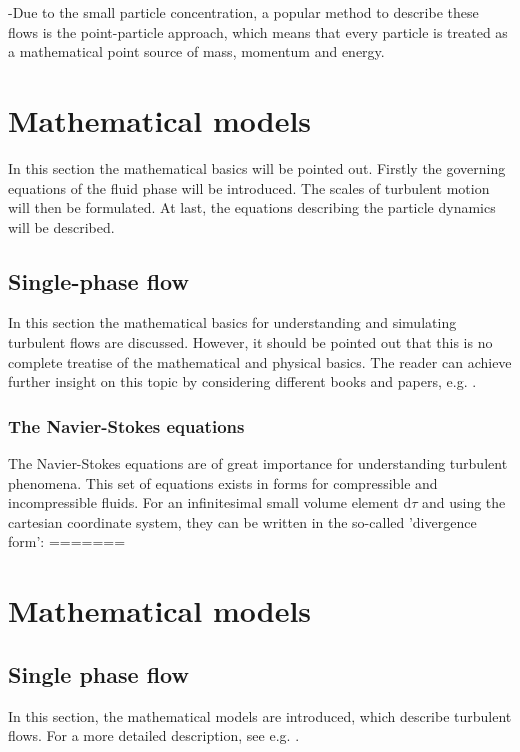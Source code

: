 \documentclass[11pt,a4paper,openany,oneside,parskip=half*]{article}
\begin{document}
-Due to the small particle concentration, a popular method to describe these flows is the point-particle approach, which means that every particle is treated as a mathematical point source of mass, momentum and energy.

\pagebreak
\section{Mathematical models}
In this section the mathematical basics will be pointed out. Firstly the governing equations of the fluid phase will be introduced. The scales of turbulent motion will then be formulated. At last, the equations describing the particle dynamics will be described. 
\subsection{Single-phase flow} %
In this section the mathematical basics for understanding and simulating turbulent flows are discussed. However, it should be pointed out that this is no
complete treatise of the mathematical and physical basics. The reader can achieve further insight on this topic by considering different books and papers, 
e.g. \cite{turbulentFlows}.
\newline
\subsubsection{The Navier-Stokes equations}
The Navier-Stokes equations are of great importance for understanding turbulent phenomena. This set of equations exists in forms for compressible and
incompressible fluids. For an infinitesimal small volume element $ \mathrm{d} \tau $ and using the cartesian coordinate system, 
they can be written in the so-called 'divergence form':
=======
\section{Mathematical models}%
\subsection{Single phase flow} %
In this section, the mathematical models are introduced, which describe turbulent flows. For a more detailed description, see e.g. \cite{turbulentFlows}.
\newline%
\end{document}

